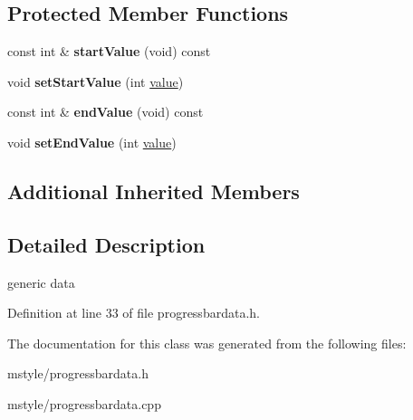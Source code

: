 \subsection*{Protected Member Functions}
\begin{DoxyCompactItemize}
\item 
\mbox{\label{class_progress_bar_data_ac9e6cabcc502afed43fd76563ce05077}} 
const int \& {\bfseries start\+Value} (void) const
\item 
\mbox{\label{class_progress_bar_data_a3f2b00fae370173024935fb0e29b1dcd}} 
void {\bfseries set\+Start\+Value} (int \hyperlink{class_progress_bar_data_a07b23a9ea479b24c4bc03f785a9a9c4f}{value})
\item 
\mbox{\label{class_progress_bar_data_a358516d9e138a55b6164b4c170ea9d11}} 
const int \& {\bfseries end\+Value} (void) const
\item 
\mbox{\label{class_progress_bar_data_a877e9f77c3190a03ed8e8baff5d46a29}} 
void {\bfseries set\+End\+Value} (int \hyperlink{class_progress_bar_data_a07b23a9ea479b24c4bc03f785a9a9c4f}{value})
\end{DoxyCompactItemize}
\subsection*{Additional Inherited Members}


\subsection{Detailed Description}
generic data 

Definition at line 33 of file progressbardata.\+h.



The documentation for this class was generated from the following files\+:\begin{DoxyCompactItemize}
\item 
mstyle/progressbardata.\+h\item 
mstyle/progressbardata.\+cpp\end{DoxyCompactItemize}
